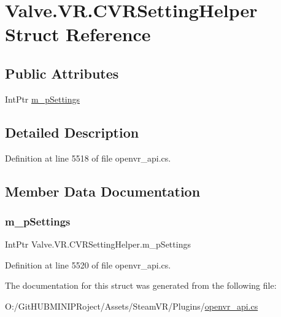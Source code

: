 \hypertarget{struct_valve_1_1_v_r_1_1_c_v_r_setting_helper}{}\section{Valve.\+V\+R.\+C\+V\+R\+Setting\+Helper Struct Reference}
\label{struct_valve_1_1_v_r_1_1_c_v_r_setting_helper}
\subsection*{Public Attributes}
\begin{DoxyCompactItemize}
\item 
Int\+Ptr \mbox{\hyperlink{struct_valve_1_1_v_r_1_1_c_v_r_setting_helper_aee6e0973ea9da47652452e912b077e45}{m\+\_\+p\+Settings}}
\end{DoxyCompactItemize}


\subsection{Detailed Description}


Definition at line 5518 of file openvr\+\_\+api.\+cs.



\subsection{Member Data Documentation}
\mbox{\label{struct_valve_1_1_v_r_1_1_c_v_r_setting_helper_aee6e0973ea9da47652452e912b077e45}} 
\subsubsection{\texorpdfstring{m\_pSettings}{m\_pSettings}}
{\footnotesize\ttfamily Int\+Ptr Valve.\+V\+R.\+C\+V\+R\+Setting\+Helper.\+m\+\_\+p\+Settings}



Definition at line 5520 of file openvr\+\_\+api.\+cs.



The documentation for this struct was generated from the following file\+:\begin{DoxyCompactItemize}
\item 
O\+:/\+Git\+H\+U\+B\+M\+I\+N\+I\+P\+Roject/\+Assets/\+Steam\+V\+R/\+Plugins/\mbox{\hyperlink{openvr__api_8cs}{openvr\+\_\+api.\+cs}}\end{DoxyCompactItemize}
